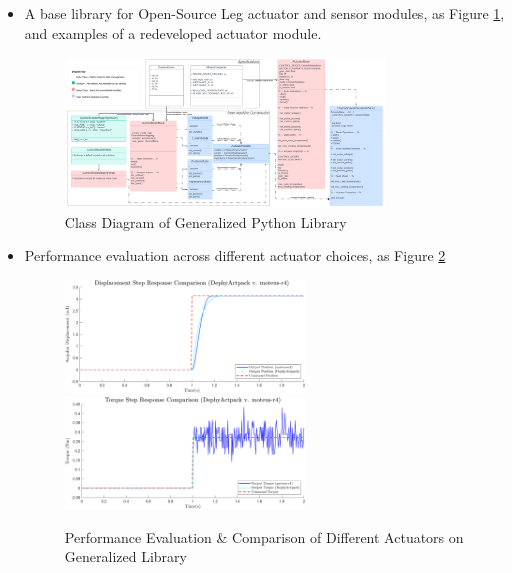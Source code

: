 \documentclass[12pt]{article}
\begin{document}
\begin{itemize}

    \item{A base library for Open-Source Leg actuator and sensor modules, as Figure \ref*{Python Lib Class Diagram}, and examples of a redeveloped actuator module.}
    
    \begin{figure}[H]
        \centering
        \includegraphics[width=0.8\textwidth]{portfolio/Class Diagram Base Lib.png}
        \caption{Class Diagram of Generalized Python Library}
        \label{Python Lib Class Diagram}
    \end{figure}
    \item {Performance evaluation across different actuator choices, as Figure \ref{Dephy-Moteus Comp}}
    
    \begin{figure}[H]
        \centering
        \includegraphics[width=0.6\textwidth]{portfolio/position_comp.png}
        \includegraphics[width=0.6\textwidth]{portfolio/torque_comp.png}
        \caption{Performance Evaluation \& Comparison of Different Actuators on Generalized Library}
        \label{Dephy-Moteus Comp}
    \end{figure}
    

\end{itemize}
\end{document}
